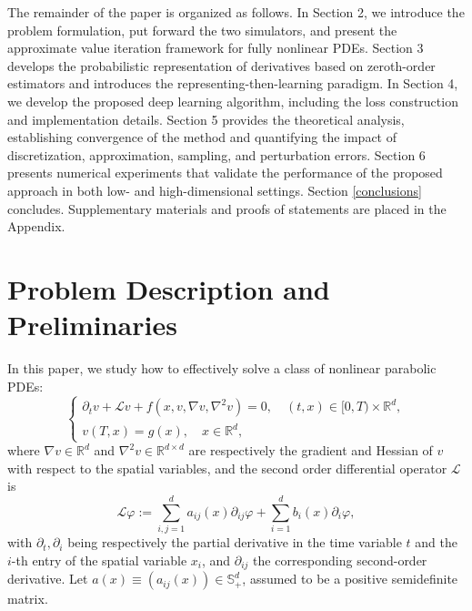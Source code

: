 \documentclass[twoside,11pt]{article}
\newcommand{\R}{\mathbb{R}}
\newcommand{\Lc}{\mathcal{L}}
\newcommand{\1}{\mathbf{1}}
\numberwithin{equation}{section}
\begin{document}


The remainder of the paper is organized as follows. In Section 2, we introduce the problem formulation, put forward the two simulators, and present the approximate value iteration framework for fully nonlinear PDEs. Section 3 develops the probabilistic representation of derivatives based on zeroth-order estimators and introduces the representing-then-learning paradigm. In Section 4, we develop  the proposed deep learning algorithm, including the loss construction and implementation details. Section 5 provides the theoretical analysis, establishing convergence of the method and quantifying the impact of discretization, approximation, sampling, and perturbation errors. Section 6 presents numerical experiments that validate the performance of the proposed approach in both low- and high-dimensional settings. Section \ref{conclusions} concludes. Supplementary materials and proofs of statements are placed in the Appendix.


\section{Problem Description and Preliminaries}
In this paper, we study how to effectively solve a class of nonlinear parabolic PDEs:
\begin{equation}\label{eq:pde}
    \begin{cases}
\partial_t v + \Lc v + f( x,v, \nabla v, \nabla^2 v) = 0, \quad (t,x) \in [0,T)\times\R^d, \\
v(T,x) = g(x), \quad x \in \R^d,
\end{cases}
\end{equation}
where $\nabla v \in \mathbb R^d$ and $\nabla^2 v\in \mathbb R^{d\times d}$ are respectively the gradient and Hessian of $v$ with respect to the spatial variables, and the second order differential operator $ \Lc$ is
$$ \Lc \varphi := \sum_{i,j=1}^d a_{ij}(x) \partial_{ij} \varphi + \sum_{i=1}^d b_i(x) \partial_i \varphi, $$
with $\partial_t,\partial_i$ being respectively the partial derivative in the time variable $t$ and the $i$-th entry of the spatial variable $x_i$, and $\partial_{ij}$  the corresponding second-order derivative. Let $a(x)\equiv (a_{ij}(x))\in \mathbb S^d_+$, assumed to be a positive semidefinite matrix.
\end{document}
